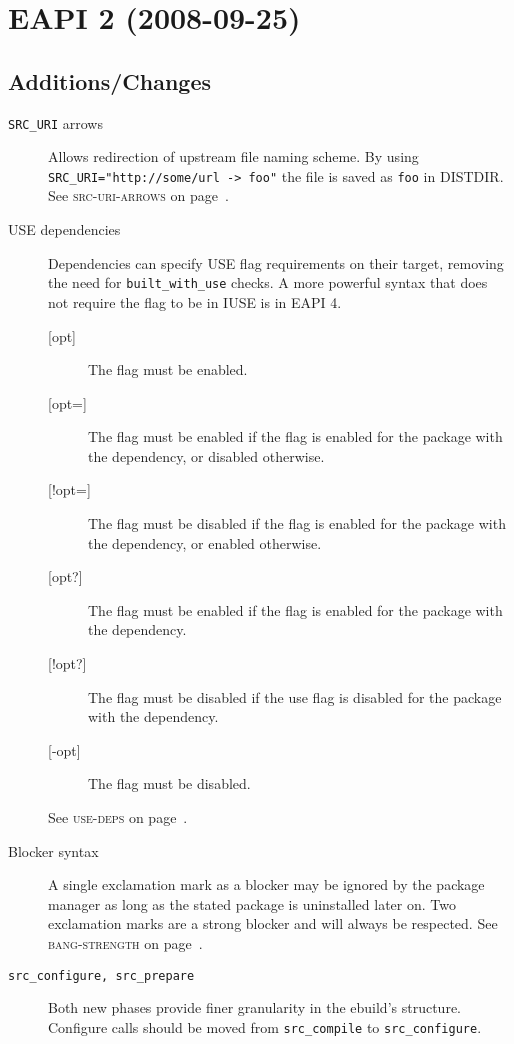 \documentclass[a4paper,notumble]{leaflet}
\newcommand{\code}[1]{\texttt{#1}}
\newcommand{\featureref}[1]{\textsc{#1} on page~\pageref{feat:#1}}
\begin{document}
\section{EAPI 2 (2008-09-25)}
\label{sec:cs:eapi2}
\subsection{Additions/Changes}
\label{sec:cs:eapi2-additions}
\begin{description}
    \item[\code{SRC\_URI} arrows] Allows redirection of upstream file
    naming scheme.  By using \code{SRC\_URI="http://some/url -> foo"}
    the file is saved as \code{foo} in DISTDIR.  See
    \featureref{src-uri-arrows}.
    \item[USE dependencies] Dependencies can specify USE flag
    requirements on their target, removing the need for
    \code{built\_with\_use} checks. A more powerful syntax that does
    not require the flag to be in IUSE is in EAPI 4.
    \begin{description}
        \item[{[opt]}] The flag must be enabled.
        \item[{[opt=]}] The flag must be enabled if the flag is
        enabled for the package with the dependency, or disabled
        otherwise.
        \item[{[!opt=]}] The flag must be disabled if the flag is
        enabled for the package with the dependency, or enabled
        otherwise.
        \item[{[opt?]}] The flag must be enabled if the flag is
        enabled for the package with the dependency.
        \item[{[!opt?]}] The flag must be disabled if the use flag is
        disabled for the package with the dependency.
        \item[{[-opt]}] The flag must be disabled.
    \end{description}
    See \featureref{use-deps}.
    \item[Blocker syntax] A single exclamation mark as a blocker may
    be ignored by the package manager as long as the stated package is
    uninstalled later on.  Two exclamation marks are a strong blocker
    and will always be respected.  See \featureref{bang-strength}.
    \item[\code{src\_configure, src\_prepare}] Both new phases provide
    finer granularity in the ebuild's structure.  Configure calls
    should be moved from \code{src\_compile} to \code{src\_configure}.

\end{description}
\end{document}
